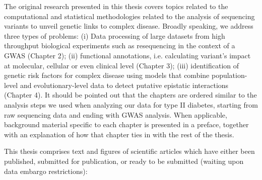 The original research presented in this thesis covers topics related to the computational and statistical methodologies related to the analysis of sequencing variants to unveil genetic links to complex disease. Broadly speaking, we address three types of problems: (i) Data processing of large datasets from high throughput biological experiments such as resequencing in the context of a GWAS (Chapter 2); (ii) functional annotations, i.e. calculating variant’s impact at molecular, cellular or even clinical level (Chapter 3); (iii) identification of genetic risk factors for complex disease using models that combine population-level and evolutionary-level data to detect putative epistatic interactions (Chapter 4). It should be pointed out that the chapters are ordered similar to the analysis steps we used when analyzing our data for type II diabetes, starting from raw sequencing data and ending with GWAS analysis. When applicable, background material specific to each chapter is presented in a preface, together with an explanation of how that chapter ties in with the rest of the thesis.

This thesis comprises text and figures of scientific articles which have either been published, submitted for publication, or ready to be submitted (waiting upon data embargo restrictions):
\\

